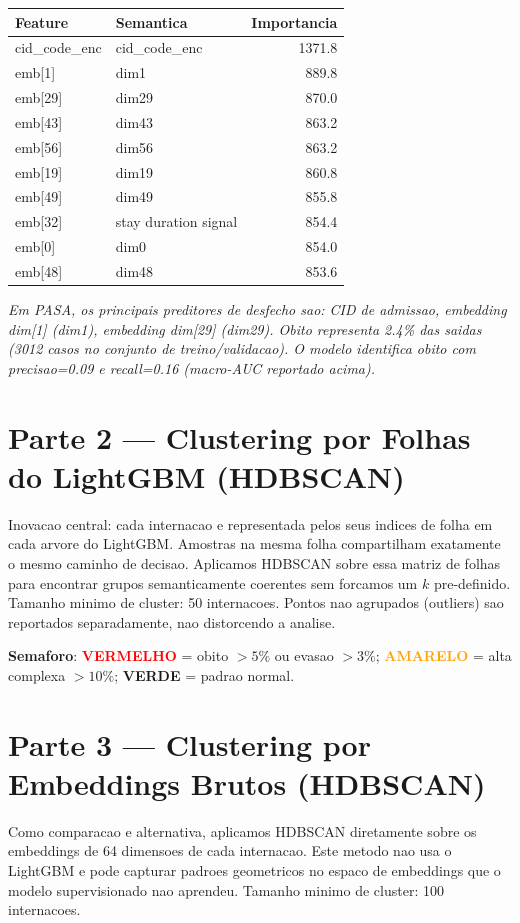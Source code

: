 \documentclass[11pt,a4paper]{article}
\begin{document}
\begin{tabular}{llr}
\toprule
Feature & Semantica & Importancia \\
\midrule
cid\_code\_enc & cid\_code\_enc & 1371.8 \\
emb[1] & dim1 & 889.8 \\
emb[29] & dim29 & 870.0 \\
emb[43] & dim43 & 863.2 \\
emb[56] & dim56 & 863.2 \\
emb[19] & dim19 & 860.8 \\
emb[49] & dim49 & 855.8 \\
emb[32] & stay duration signal & 854.4 \\
emb[0] & dim0 & 854.0 \\
emb[48] & dim48 & 853.6 \\
\bottomrule
\end{tabular}

\vspace{4pt}\noindent\textit{Em PASA, os principais preditores de desfecho sao: CID de admissao, embedding dim[1] (dim1), embedding dim[29] (dim29). Obito representa 2.4\% das saidas (3012 casos no conjunto de treino/validacao). O modelo identifica obito com precisao=0.09 e recall=0.16 (macro-AUC reportado acima).}

\newpage
\section{Parte 2 --- Clustering por Folhas do LightGBM (HDBSCAN)}
Inovacao central: cada internacao e representada pelos seus indices de folha em cada arvore do LightGBM. Amostras na mesma folha compartilham exatamente o mesmo caminho de decisao. Aplicamos HDBSCAN sobre essa matriz de folhas para encontrar grupos semanticamente coerentes sem forcamos um $k$ pre-definido. Tamanho minimo de cluster: 50 internacoes. Pontos nao agrupados (outliers) sao reportados separadamente, nao distorcendo a analise.\par\noindent\textbf{Semaforo}: \textcolor{red}{\textbf{VERMELHO}} = obito $>5\%$ ou evasao $>3\%$; \textcolor{orange}{\textbf{AMARELO}} = alta complexa $>10\%$; \textcolor{green!60!black}{\textbf{VERDE}} = padrao normal.

\section{Parte 3 --- Clustering por Embeddings Brutos (HDBSCAN)}
Como comparacao e alternativa, aplicamos HDBSCAN diretamente sobre os embeddings de 64 dimensoes de cada internacao. Este metodo nao usa o LightGBM e pode capturar padroes geometricos no espaco de embeddings que o modelo supervisionado nao aprendeu. Tamanho minimo de cluster: 100 internacoes.
\end{document}

